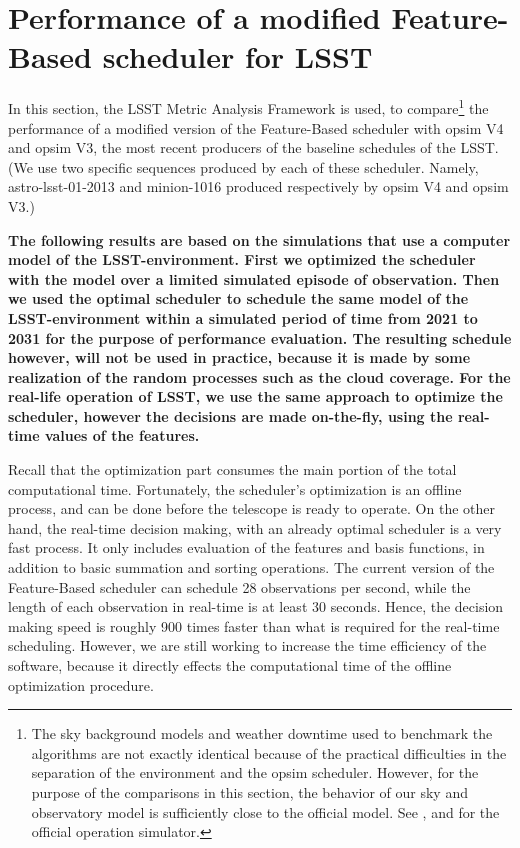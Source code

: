 \documentclass[12pt]{aastex62}
\theoremstyle{definition}
\begin{document}
\section{Performance of a modified Feature-Based scheduler for LSST}\label{sec_comp}
In this section, the LSST Metric Analysis Framework \citep{jones2014lsst} is used, to compare\footnote{The sky background models and weather downtime used to benchmark the algorithms are not exactly identical because of the practical difficulties in the separation of the environment and the opsim scheduler. However, for the purpose of the comparisons in this section, the behavior of our sky and observatory model is sufficiently close to the official model. See \citep{2016SPIE.9910E..13D}, and \citep{2016SPIE.9911E..25R} for the official operation simulator.} the performance of a modified version of the Feature-Based scheduler with opsim V4 and opsim V3, the most recent producers of the baseline schedules of the LSST. (We use two specific sequences produced by each of these scheduler. Namely, astro-lsst-01-2013 and minion-1016 produced respectively by opsim V4 and opsim V3.)

{\bf The following results are based on the simulations that use a computer model of the LSST-environment. First we optimized the scheduler with the model over a limited simulated episode of observation. Then we used the optimal scheduler to schedule the same model of the LSST-environment within a simulated period of time from 2021 to 2031 for the purpose of performance evaluation. The resulting schedule however, will not be used in practice, because it is made by some realization of the random processes such as the cloud coverage. For the real-life operation of LSST, we use the same approach to optimize the scheduler, however the decisions are made on-the-fly, using the real-time values of the features. 

Recall that the optimization part consumes the main portion of the total computational time. Fortunately, the scheduler's optimization is an offline process, and can be done before the telescope is ready to operate. On the other hand, the real-time decision making, with an already optimal scheduler is a very fast process. It only includes evaluation of the features and basis functions, in addition to basic summation and sorting operations. The current version of the Feature-Based scheduler can schedule 28 observations per second, while the length of each observation in real-time is at least 30 seconds. Hence, the decision making speed is roughly 900 times faster than what is required for the real-time scheduling. However, we are still working to increase the time efficiency of the software, because it directly effects the computational time of the offline optimization procedure.\bf}
\end{document}

